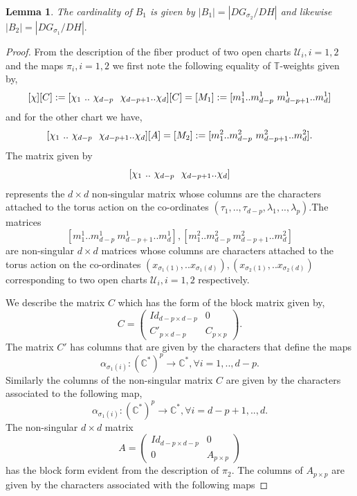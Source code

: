 \documentclass[10pt]{amsart}
\newtheorem{lem}[prop]{Lemma}
\numberwithin{equation}{subsection}
\begin{document}
\begin{lem} 
The cardinality of $B_1$ is given by $|B_1|=|DG_{\sigma_2}/DH|$ and likewise $|B_2|=|DG_{\sigma_1}/DH|.$
\end{lem}
\begin{proof}
From the description of the fiber product of two open charts $\mathscr{U}_i,i=1,2$ and the maps $\pi_i,i=1,2$ we first note the following equality of $\mathbb{T}$-weights given by,
$$[\chi][C]:=[\chi_1\ ..\ \chi_{d-p}\ \ \chi_{d-p+1}\\ .. \chi_{d}][C]=[M_1]:=[m^1_{1}..m^1_{d-p}\ m^1_{d-p+1}.. m^1_{d} ]$$ and for the other chart we have,
$$[\chi_1\ ..\ \chi_{d-p}\ \ \chi_{d-p+1}\\ .. \chi_{d}][A]=[M_2]:=[m^2_{1} ..m^2_{d-p}\ m^2_{d-p+1}.. m^2_{d} ].$$\newline
The matrix given by $$[\chi_1\ ..\ \chi_{d-p}\ \ \chi_{d-p+1}\\ .. \chi_{d}]$$ represents the $d\times d$ non-singular matrix whose columns are the characters attached to the torus action on the co-ordinates $(\tau_1,..,\tau_{d-p},\lambda_1,..,\lambda_p).$\newline The matrices $$[m^1_{1}..m^1_{d-p}\ m^1_{d-p+1}.. m^1_{d} ],[m^2_{1} ..m^2_{d-p}\ m^2_{d-p+1}.. m^2_{d} ]$$ are non-singular $d\times d$ matrices whose columns are characters attached to the torus action on the co-ordinates 
$(x_{\sigma_{1}(1)},..x_{\sigma_{1}(d)}),(x_{\sigma_{2}(1)},..x_{\sigma_{2}(d)})$ corresponding to two open charts $\mathscr{U}_i,i=1,2$ respectively.\par
We describe the matrix $C$ which has the form of the block matrix given by,
$$C=\left(\begin{array}{cc} Id_{d-p \times d-p} & 0\\ C'_{p\times d-p} & C_{p\times p} \end{array}\right).$$
The matrix $C'$ has columns that are given by the characters that define the maps $$\alpha_{\sigma_{1}(i)}:(\mathbb{C}^{*})^{p}\to \mathbb{C}^{*}, \forall i=1,..,d-p.$$ Similarly the columns of the non-singular matrix $C$ are given by the characters associated to the following map,
$$\alpha_{\sigma_{1}(i)}:(\mathbb{C}^{*})^{p}\to \mathbb{C}^{*}, \forall i=d-p+1,..,d.$$\newline
The non-singular $d\times d$ matrix $$A=\left(\begin{array}{cc} Id_{d-p \times d-p} & 0\\ 0 & A_{p\times p} \end{array}\right)$$ has the block form evident from the description of $\pi_2.$ The columns of $A_{p\times p}$ are given by the characters associated with the following maps

\end{proof}
\end{document}
